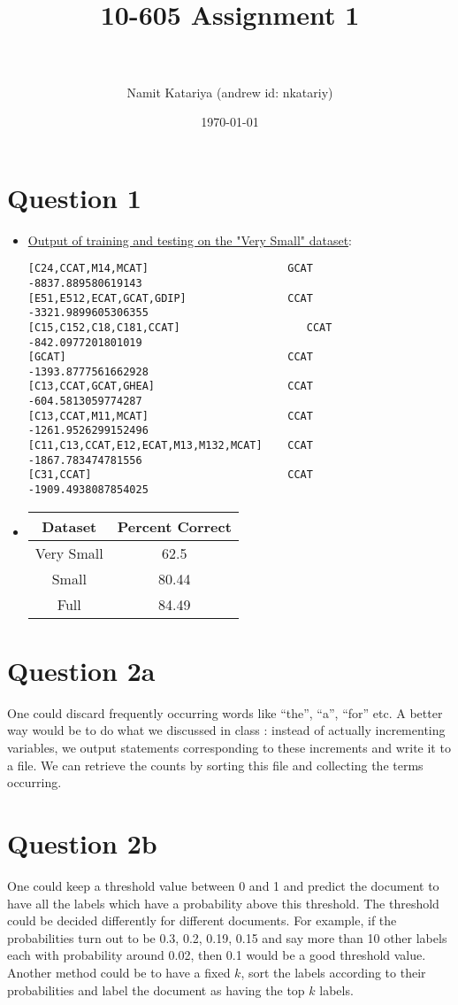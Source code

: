 \documentclass[paper=a4, fontsize=11pt]{scrartcl} %
\title{	
\normalfont \normalsize 
\horrule{0.5pt} \\[0.4cm] %
\huge{10-605 Assignment 1} \\ %
\horrule{2pt} \\[0.5cm] %
}
\author{Namit Katariya (andrew id: nkatariy)} %
\date{\normalsize\today} %
\numberwithin{equation}{section} %
\numberwithin{figure}{section} %
\numberwithin{table}{section} %
\begin{document}
\maketitle 

\section*{\textbf{Question 1}}

\begin{itemize}
\item \underline{Output of training and testing on the "Very Small" dataset}:
\begin{verbatim}
[C24,CCAT,M14,MCAT]                      GCAT     -8837.889580619143
[E51,E512,ECAT,GCAT,GDIP]                CCAT     -3321.9899605306355
[C15,C152,C18,C181,CCAT]	                CCAT	    -842.0977201801019
[GCAT]                                   CCAT     -1393.8777561662928
[C13,CCAT,GCAT,GHEA]                     CCAT     -604.5813059774287
[C13,CCAT,M11,MCAT]                      CCAT     -1261.9526299152496
[C11,C13,CCAT,E12,ECAT,M13,M132,MCAT]    CCAT     -1867.783474781556
[C31,CCAT]                               CCAT     -1909.4938087854025
\end{verbatim}
\item
\begin{tabular}{|c | c|}
\hline
\textbf{Dataset} & \textbf{Percent Correct} \\
\hline
Very Small & 62.5 \\
Small & 80.44 \\
Full & 84.49 \\
\hline
\end{tabular}
\end{itemize}

\section*{\textbf{Question 2a}}
One could discard frequently occurring words like ``the'', ``a'', ``for'' etc. A better way would be to do what we discussed in class : instead of actually incrementing variables, we output statements corresponding to these increments and write it to a file. We can retrieve the counts by sorting this file and collecting the terms occurring. 

\section*{\textbf{Question 2b}}
One could keep a threshold value between 0 and 1 and predict the document to have all the labels which have a probability above this threshold. The threshold could be decided differently for different documents. For example, if the probabilities turn out to be 0.3, 0.2, 0.19, 0.15 and say more than 10 other labels each with probability around 0.02, then 0.1 would be a good threshold value. \\
Another method could be to have a fixed $k$, sort the labels according to their probabilities and label the document as having the top $k$ labels. 
\end{document}
